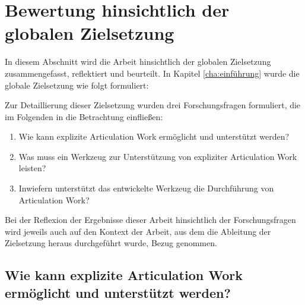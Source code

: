 \section{Bewertung hinsichtlich der globalen Zielsetzung}
\label{sec:bewertung_hinsichtlich_der_globalen_zielsetzung}

In diesem Abschnitt wird die Arbeit hinsichtlich der globalen Zielsetzung zusammengefasst, reflektiert und beurteilt. In Kapitel \ref{cha:einführung} wurde die globale Zielsetzung wie folgt formuliert:


Zur Detaillierung dieser Zielsetzung wurden drei Forschungsfragen formuliert, die im Folgenden in die Betrachtung einfließen:
\begin{enumerate}
	\item Wie kann explizite Articulation Work ermöglicht und unterstützt werden?
	\item Was muss ein Werkzeug zur Unterstützung von expliziter Articulation Work leisten?
	\item Inwiefern unterstützt das entwickelte Werkzeug die Durchführung von Articulation Work?
\end{enumerate}

Bei der Reflexion der Ergebnisse dieser Arbeit hinsichtlich der Forschungsfragen wird jeweils auch auf den Kontext der Arbeit, aus dem die Ableitung der Zielsetzung heraus durchgeführt wurde, Bezug genommen.

\subsection{Wie kann explizite Articulation Work ermöglicht und unterstützt werden?}

